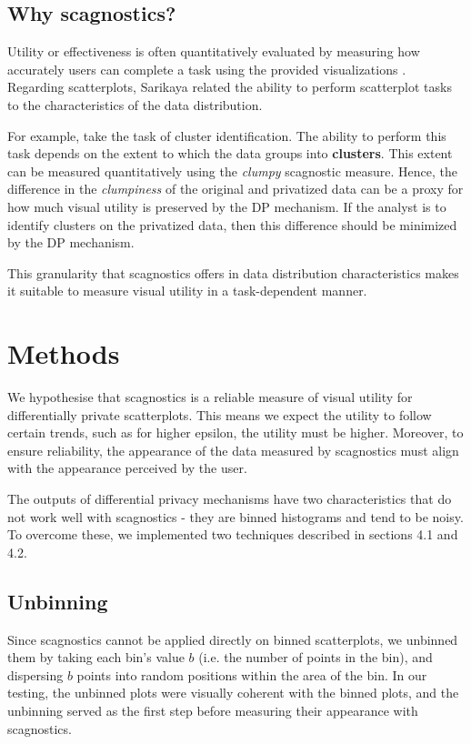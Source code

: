 \documentclass[journal]{vgtc}                     %
\begin{document}
\subsection{Why scagnostics?}
Utility or effectiveness is often quantitatively evaluated by measuring how accurately users can complete a task using the provided visualizations \cite{Elmqvist2012}. Regarding scatterplots, Sarikaya \cite{Sarikaya2018} related the ability to perform scatterplot tasks to the characteristics of the data distribution.

\par For example, take the task of cluster identification. The ability to perform this task depends on the extent to which the data groups into \textbf{clusters}\cite{Sarikaya2018}. This extent can be measured quantitatively using the \textit{clumpy} scagnostic measure. Hence, the difference in the \textit{clumpiness} of the original and privatized data can be a proxy for how much visual utility is preserved by the DP mechanism. If the analyst is to identify clusters on the privatized data, then this difference should be minimized by the DP mechanism. 
\par
This granularity that scagnostics offers in data distribution characteristics makes it suitable to measure visual utility in a task-dependent manner.


\section{Methods}

We hypothesise that scagnostics is a reliable measure of visual utility for differentially private scatterplots. This means we expect the utility to follow certain trends, such as for higher epsilon, the utility must be higher. Moreover, to ensure reliability, the appearance of the data measured by scagnostics must align with the appearance perceived by the user. \par The outputs of differential privacy mechanisms have two characteristics that do not work well with scagnostics - they are binned histograms and tend to be noisy. To overcome these, we implemented two techniques described in sections 4.1 and 4.2.
          
\subsection{Unbinning}
Since scagnostics cannot be applied directly on binned scatterplots, we unbinned them by taking each bin's value $b$ (i.e. the number of points in the bin), and dispersing $b$ points into random positions within the area of the bin. In our testing, the unbinned plots were visually coherent with the binned plots, and the unbinning served as the first step before measuring their appearance with scagnostics.
\end{document}
